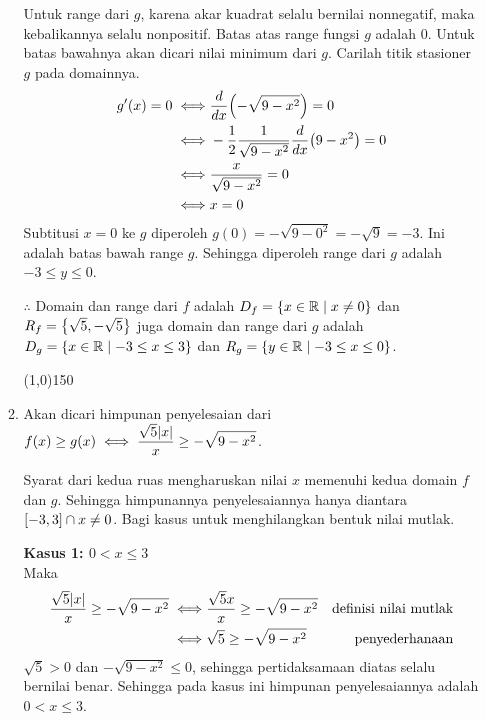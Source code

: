 \begin{enumerate}[leftmargin=*, label={\arabic*}.]
\begin{enumerate}[label={\alph*}.]
    Untuk range dari $g$, karena akar kuadrat selalu bernilai nonnegatif, maka kebalikannya selalu 
    nonpositif. Batas atas range fungsi $g$ adalah $0$. Untuk batas bawahnya akan dicari nilai minimum 
    dari $g$. Carilah titik stasioner $g$ pada domainnya.
    \begin{align*}
        g'(x) = 0 \iff &\drv{x}{-\sqrt{9-x^{2}}} = 0\\
        \iff &-\frac{1}{2}\frac{1}{\sqrt{9-x^{2}}}\drv{x}{9-x^{2}}=0\\
        \iff &\frac{x}{\sqrt{9-x^{2}}} = 0\\
        \iff & x=0
    \end{align*}
    Subtitusi $x=0$ ke $g$ diperoleh $g(0) = -\sqrt{9-0^{2}} = -\sqrt{9}=-3$. Ini adalah batas 
    bawah range $g$. Sehingga diperoleh range dari $g$ adalah $-3 \leq y \leq 0$.

    $\therefore$ Domain dan range dari $f$ adalah $D_f=\set*{x\in \mathbb{R} \mid x\neq 0}$ dan 
    $R_f=\set*{\sqrt{5},-\sqrt{5}}$ juga domain dan range dari $g$ adalah 
    $D_g=\set*{x\in \mathbb{R} \mid -3 \leq x \leq 3}$ dan 
    $R_g=\set*{y\in \mathbb{R} \mid -3 \leq x \leq 0}$.

\begin{center}
    \line(1,0){150}
\end{center}

    \item Akan dicari himpunan penyelesaian dari $\ds f(x) \geq g(x) 
    \iff \frac{\sqrt{5}\abs{x}}{x} \geq -\sqrt{9-x^{2}}$.

    Syarat dari kedua ruas mengharuskan nilai $x$ memenuhi kedua domain $f$ dan $g$. 
    Sehingga himpunannya penyelesaiannya hanya diantara $\cic{-3,3} \cap x \neq 0$.
    Bagi kasus untuk menghilangkan bentuk nilai mutlak.

    \textbf{Kasus 1: $0 < x \leq 3$}\\
    Maka
    \begin{align*}
        \frac{\sqrt{5}\abs{x}}{x} \geq -\sqrt{9-x^{2}}
        \iff &\frac{\sqrt{5}x}{x} \geq -\sqrt{9-x^{2}} 
        &\text{definisi nilai mutlak} \\
        \iff &\sqrt{5} \geq -\sqrt{9-x^{2}}
        &\text{penyederhanaan}
    \end{align*}
    $\sqrt{5}>0$ dan $-\sqrt{9-x^{2}} \leq 0$, sehingga pertidaksamaan diatas selalu 
    bernilai benar. Sehingga pada kasus ini himpunan penyelesaiannya adalah $0 < x \leq 3$.


\end{enumerate}
\end{enumerate}
